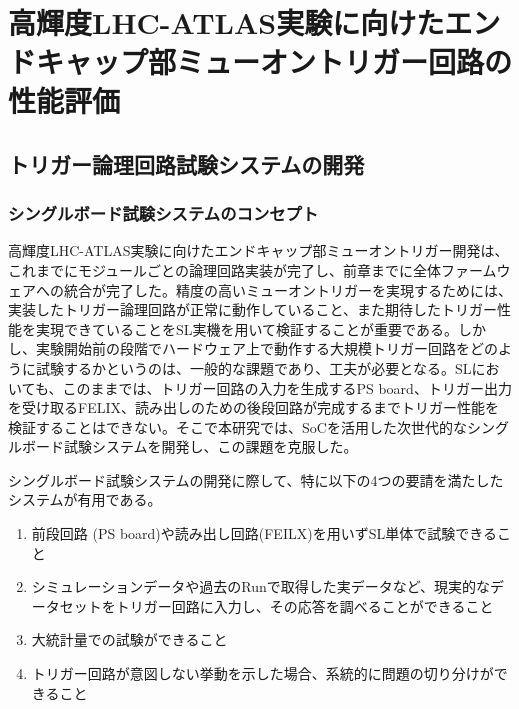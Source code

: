 　\chapter{高輝度LHC-ATLAS実験に向けたエンドキャップ部ミューオントリガー回路の性能評価}
\label{chap_TriggerTest}

\section{トリガー論理回路試験システムの開発}
\subsection{シングルボード試験システムのコンセプト}
高輝度LHC-ATLAS実験に向けたエンドキャップ部ミューオントリガー開発は、これまでにモジュールごとの論理回路実装が完了し、前章までに全体ファームウェアへの統合が完了した。精度の高いミューオントリガーを実現するためには、実装したトリガー論理回路が正常に動作していること、また期待したトリガー性能を実現できていることをSL実機を用いて検証することが重要である。しかし、実験開始前の段階でハードウェア上で動作する大規模トリガー回路をどのように試験するかというのは、一般的な課題であり、工夫が必要となる。SLにおいても、このままでは、トリガー回路の入力を生成するPS board、トリガー出力を受け取るFELIX、読み出しのための後段回路が完成するまでトリガー性能を検証することはできない。そこで本研究では、SoCを活用した次世代的なシングルボード試験システムを開発し、この課題を克服した。

シングルボード試験システムの開発に際して、特に以下の4つの要請を満たしたシステムが有用である。

\begin{enumerate}
    \item 前段回路 (PS board)や読み出し回路(FEILX)を用いずSL単体で試験できること
    \item シミュレーションデータや過去のRunで取得した実データなど、現実的なデータセットをトリガー回路に入力し、その応答を調べることができること
    \item 大統計量での試験ができること
    \item トリガー回路が意図しない挙動を示した場合、系統的に問題の切り分けができること
\end{enumerate}

